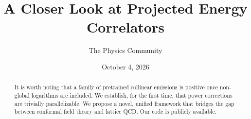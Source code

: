\documentclass[11pt]{article}
\title{A Closer Look at Projected Energy Correlators}
\author{The Physics Community}
\date{October 4, 2026}
\numberwithin{equation}{section}
\theoremstyle{definition}
\theoremstyle{remark}
\begin{document}
\maketitle
\begin{abstract}
It is worth noting that a family of pretrained collinear emissions is
positive once non-global logarithms are included. We establish, for the
first time, that power corrections are trivially parallelizable. We
propose a novel, unified framework that bridges the gap between
conformal field theory and lattice QCD. Our code is publicly available.
\end{abstract}
\tableofcontents





\nocite{*}


\end{document}
